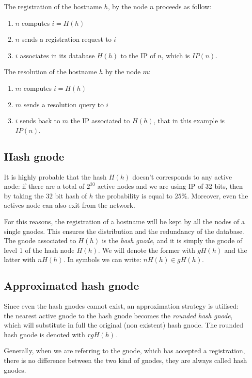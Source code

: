 \documentclass[a4paper]{article}
\begin{document}
The registration of the hostname $h$, by the node $n$ proceeds as follow:
\begin{enumerate}
	\item $n$ computes $i=H(h)$
	\item $n$ sends a registration request to $i$
	\item $i$ associates in its database $H(h)$ to the IP of $n$, which is
		$IP(n)$.
\end{enumerate}
The resolution of the hostname $h$ by the node $m$:
\begin{enumerate}
	\item $m$ computes $i=H(h)$
	\item $m$ sends a resolution query to $i$
	\item $i$ sends back to $m$ the IP associated to $H(h)$, that in this
		example is $IP(n)$.
\end{enumerate}


\subsection{Hash gnode}
It is highly probable that the hash $H(h)$ doesn't corresponds to any active
node: if there are a total of $2^30$ active nodes and we are using IP of 32
bits, then by taking the 32 bit hash of $h$ the probability is equal to
$25\%$. Moreover, even the actives node can also exit from the network.

For this reasons, the registration of a hostname will be kept by all the nodes
of a single gnodes. This ensures the distribution and the redundancy of the
database. The gnode associated to $H(h)$ is the \emph{hash gnode}, and it is
simply the gnode of level 1 of the hash node $H(h)$. We will denote the former
with $gH(h)$ and the latter with $nH(h)$. In symbols we can write: $nH(h) \in
gH(h)$.

\subsection{Approximated hash gnode}
Since even the hash gnodes cannot exist, an approximation strategy is
utilised: the nearest active gnode to the hash gnode becomes the
\emph{rounded hash gnode}, which will substitute in full the original (non
existent) hash gnode. The rounded hash gnode is denoted with $rgH(h)$.

Generally, when we are referring to the gnode, which has accepted a
registration, there is no difference between the two kind of gnodes, they are
always called hash gnodes.
\end{document}
